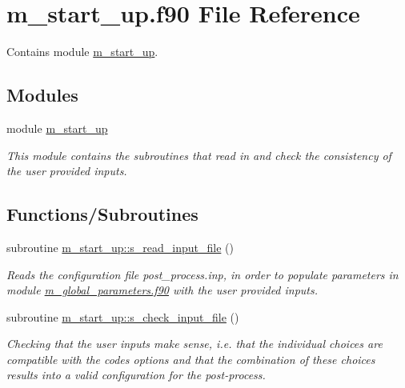 \hypertarget{m__start__up_8f90}{}\section{m\+\_\+start\+\_\+up.\+f90 File Reference}
\label{m__start__up_8f90}


Contains module \hyperlink{namespacem__start__up}{m\+\_\+start\+\_\+up}.  


\subsection*{Modules}
\begin{DoxyCompactItemize}
\item 
module \hyperlink{namespacem__start__up}{m\+\_\+start\+\_\+up}
\begin{DoxyCompactList}\small\item\em This module contains the subroutines that read in and check the consistency of the user provided inputs. \end{DoxyCompactList}\end{DoxyCompactItemize}
\subsection*{Functions/\+Subroutines}
\begin{DoxyCompactItemize}
\item 
subroutine \hyperlink{namespacem__start__up_a3a19eb11ae434dc590a1bd7835442891}{m\+\_\+start\+\_\+up\+::s\+\_\+read\+\_\+input\+\_\+file} ()
\begin{DoxyCompactList}\small\item\em Reads the configuration file post\+\_\+process.\+inp, in order to populate parameters in module \hyperlink{m__global__parameters_8f90}{m\+\_\+global\+\_\+parameters.\+f90} with the user provided inputs. \end{DoxyCompactList}\item 
subroutine \hyperlink{namespacem__start__up_ad77478b402c186b1f620b7d14aab9123}{m\+\_\+start\+\_\+up\+::s\+\_\+check\+\_\+input\+\_\+file} ()
\begin{DoxyCompactList}\small\item\em Checking that the user inputs make sense, i.\+e. that the individual choices are compatible with the code\textquotesingle{}s options and that the combination of these choices results into a valid configuration for the post-\/process. \end{DoxyCompactList}\end{DoxyCompactItemize}


